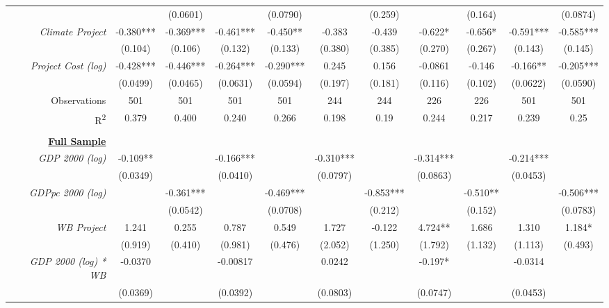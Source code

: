 \documentclass{article}
\begin{document}
\begin{singlespace}
\begin{landscape}
\begin{table}[H]
{\begin{tabular}{rcccccccccc}
					\textit{} &  & (0.0601) &  & (0.0790) &  & (0.259) &  & (0.164) &  & (0.0874) \\
					\textit{Climate Project} & -0.380*** & -0.369*** & -0.461*** & -0.450** & -0.383 & -0.439 & -0.622* & -0.656* & -0.591*** & -0.585*** \\
					\textit{} & (0.104) & (0.106) & (0.132) & (0.133) & (0.380) & (0.385) & (0.270) & (0.267) & (0.143) & (0.145) \\
					\textit{Project Cost (log)} & -0.428*** & -0.446*** & -0.264*** & -0.290*** & 0.245 & 0.156 & -0.0861 & -0.146 & -0.166** & -0.205*** \\
					\textit{} & (0.0499) & (0.0465) & (0.0631) & (0.0594) & (0.197) & (0.181) & (0.116) & (0.102) & (0.0622) & (0.0590) \\ \hline
					Observations & 501 & 501 & 501 & 501 & 244 & 244 & 226 & 226 & 501 & 501 \\
					R\textsuperscript{2} & 0.379 & 0.400 & 0.240 & 0.266 & 0.198 & 0.19 & 0.244 & 0.217 & 0.239 & 0.25 \\ \hline
					\multicolumn{1}{l}{\textit{}} & \multicolumn{1}{l}{} & \multicolumn{1}{l}{} & \multicolumn{1}{l}{} & \multicolumn{1}{l}{} & \multicolumn{1}{l}{} & \multicolumn{1}{l}{} & \multicolumn{1}{l}{} & \multicolumn{1}{l}{} & \multicolumn{1}{l}{} & \multicolumn{1}{l}{} \\
					{\ul \textbf{Full Sample}} &  &  &  &  &  &  &  &  &  &  \\
					\textit{GDP 2000 (log)} & -0.109** &  & -0.166*** &  & -0.310*** &  & -0.314*** &  & -0.214*** &  \\
					\textit{} & (0.0349) &  & (0.0410) &  & (0.0797) &  & (0.0863) &  & (0.0453) &  \\
					\textit{GDPpc 2000 (log)} &  & -0.361*** &  & -0.469*** &  & -0.853*** &  & -0.510** &  & -0.506*** \\
					\textit{} &  & (0.0542) &  & (0.0708) &  & (0.212) &  & (0.152) &  & (0.0783) \\
					\textit{WB Project} & 1.241 & 0.255 & 0.787 & 0.549 & 1.727 & -0.122 & 4.724** & 1.686 & 1.310 & 1.184* \\
					\textit{} & (0.919) & (0.410) & (0.981) & (0.476) & (2.052) & (1.250) & (1.792) & (1.132) & (1.113) & (0.493) \\
					\textit{GDP 2000 (log) * WB} & -0.0370 &  & -0.00817 &  & 0.0242 &  & -0.197* &  & -0.0314 &  \\
					\textit{} & (0.0369) &  & (0.0392) &  & (0.0803) &  & (0.0747) &  & (0.0453) &  \\

\end{tabular}}
\end{table}
\end{landscape}
\end{singlespace}
\end{document}
